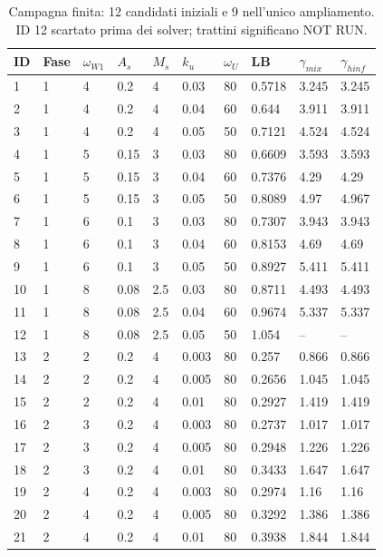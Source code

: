 \begin{table}[htbp]\centering\small
\begin{tabular}{llllllllll}\toprule
ID & Fase & $\omega_{W1}$ & $A_s$ & $M_s$ & $k_u$ & $\omega_U$ & LB & $\gamma_{mix}$ & $\gamma_{hinf}$\\\midrule
1 & 1 & 4 & 0.2 & 4 & 0.03 & 80 & 0.5718 & 3.245 & 3.245\\
2 & 1 & 4 & 0.2 & 4 & 0.04 & 60 & 0.644 & 3.911 & 3.911\\
3 & 1 & 4 & 0.2 & 4 & 0.05 & 50 & 0.7121 & 4.524 & 4.524\\
4 & 1 & 5 & 0.15 & 3 & 0.03 & 80 & 0.6609 & 3.593 & 3.593\\
5 & 1 & 5 & 0.15 & 3 & 0.04 & 60 & 0.7376 & 4.29 & 4.29\\
6 & 1 & 5 & 0.15 & 3 & 0.05 & 50 & 0.8089 & 4.97 & 4.967\\
7 & 1 & 6 & 0.1 & 3 & 0.03 & 80 & 0.7307 & 3.943 & 3.943\\
8 & 1 & 6 & 0.1 & 3 & 0.04 & 60 & 0.8153 & 4.69 & 4.69\\
9 & 1 & 6 & 0.1 & 3 & 0.05 & 50 & 0.8927 & 5.411 & 5.411\\
10 & 1 & 8 & 0.08 & 2.5 & 0.03 & 80 & 0.8711 & 4.493 & 4.493\\
11 & 1 & 8 & 0.08 & 2.5 & 0.04 & 60 & 0.9674 & 5.337 & 5.337\\
12 & 1 & 8 & 0.08 & 2.5 & 0.05 & 50 & 1.054 & -- & --\\
13 & 2 & 2 & 0.2 & 4 & 0.003 & 80 & 0.257 & 0.866 & 0.866\\
14 & 2 & 2 & 0.2 & 4 & 0.005 & 80 & 0.2656 & 1.045 & 1.045\\
15 & 2 & 2 & 0.2 & 4 & 0.01 & 80 & 0.2927 & 1.419 & 1.419\\
16 & 2 & 3 & 0.2 & 4 & 0.003 & 80 & 0.2737 & 1.017 & 1.017\\
17 & 2 & 3 & 0.2 & 4 & 0.005 & 80 & 0.2948 & 1.226 & 1.226\\
18 & 2 & 3 & 0.2 & 4 & 0.01 & 80 & 0.3433 & 1.647 & 1.647\\
19 & 2 & 4 & 0.2 & 4 & 0.003 & 80 & 0.2974 & 1.16 & 1.16\\
20 & 2 & 4 & 0.2 & 4 & 0.005 & 80 & 0.3292 & 1.386 & 1.386\\
21 & 2 & 4 & 0.2 & 4 & 0.01 & 80 & 0.3938 & 1.844 & 1.844\\
\bottomrule\end{tabular}
\caption{Campagna finita: 12 candidati iniziali e 9 nell'unico ampliamento. ID 12 scartato prima dei solver; trattini significano NOT RUN.}\end{table}
